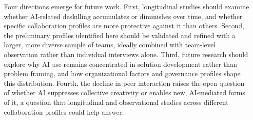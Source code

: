 \documentclass[10pt,journal,compsoc]{IEEEtran}
\begin{document}
Four directions emerge for future work. First, longitudinal studies should examine whether AI-related deskilling accumulates or diminishes over time, and whether specific collaboration profiles are more protective against it than others. Second, the preliminary profiles identified here should be validated and refined with a larger, more diverse sample of teams, ideally combined with team-level observation rather than individual interviews alone. Third, future research should explore why AI use remains concentrated in solution development rather than problem framing, and how organizational factors and governance profiles shape this distribution. Fourth, the decline in peer interaction raises the open question of whether AI suppresses collective creativity or enables new, AI-mediated forms of it, a question that longitudinal and observational studies across different collaboration profiles could help answer.



\end{document}
